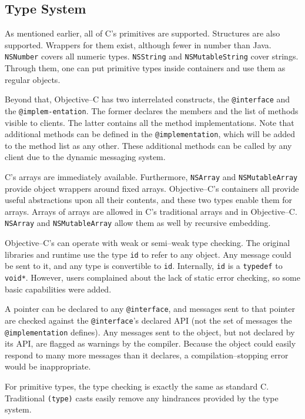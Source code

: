 \subsection{Type System}
	As mentioned earlier, all of C's primitives are supported.  Structures are also supported.  Wrappers for them exist, although fewer in number than Java.  \texttt{NSNumber} covers all numeric types.  \texttt{NSString} and \texttt{NSMutableString} cover strings.  Through them, one can put primitive types inside containers and use them as regular objects.

	  Beyond that, Objective--C has two interrelated constructs, the \texttt{@interface} and the \texttt{@impl\-em\--ent\-at\-ion}.  The former declares the members and the list of methods visible to clients.  The latter contains all the method implementations.  Note that additional methods can be defined in the \texttt{@implementation}, which will be added to the method list as any other.  These additional methods can be called by any client due to the dynamic messaging system.

	C's arrays are immediately available.  Furthermore, \texttt{NSArr\-ay} and \texttt{NSM\-ut\-ab\-le\-Arr\-ay} provide object wrappers around fixed arrays.  Objective--C's containers all provide useful abstractions upon all their contents, and these two types enable them for arrays.  Arrays of arrays are allowed in C's traditional arrays and in Objective--C.  \texttt{NSArr\-ay} and \texttt{NSM\-ut\-ab\-le\-Arr\-ay} allow them as well by recursive embedding.

	Objective--C's can operate with weak or semi--weak type checking.  The original libraries and runtime use the type \texttt{id} to refer to any object.  Any message could be sent to it, and any type is convertible to \texttt{id}.  Internally, \texttt{id} is a \texttt{typedef} to \texttt{void*}.  However, users complained about the lack of static error checking, so some basic capabilities were added.

	A pointer can be declared to any \texttt{@interface}, and messages sent to that pointer are checked against the \texttt{@interface}'s declared API (not the set of messages the \texttt{@implementation} defines).  Any messages sent to the object, but not declared by its API, are flagged as warnings by the compiler.  Because the object could easily respond to many more messages than it declares, a compilation--stopping error would be inappropriate.

	For primitive types, the type checking is exactly the same as standard C.  Traditional \texttt{(type)} casts easily remove any hindrances provided by the type system.

